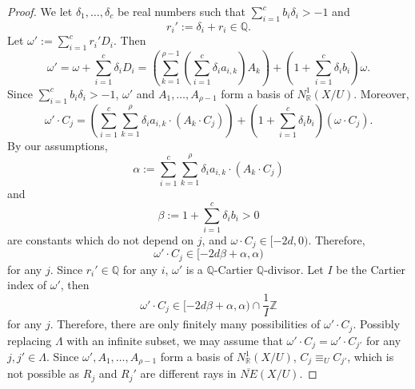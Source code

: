 \documentclass[11pt]{amsart}
\numberwithin{equation}{section}
\newcommand{\Qq}{\mathbb{Q}}
\newcommand{\Rr}{\mathbb{R}}
\theoremstyle{definition}
\theoremstyle{definition}
\theoremstyle{definition}
\begin{document}
\begin{proof}
We let $\delta_1,\dots,\delta_c$ be real numbers such that $\sum_{i=1}^cb_i\delta_i>-1$ and 
$$r_i':=\delta_i+r_i\in\mathbb Q.$$ 
Let $\omega':=\sum_{i=1}^cr_i'D_i$. Then 
$$\omega'=\omega+\sum_{i=1}^c\delta_iD_i=\left(\sum_{k=1}^{\rho-1}\left(\sum_{i=1}^c\delta_ia_{i,k}\right)A_k\right)+\left(1+\sum_{i=1}^c\delta_ib_i\right)\omega.$$
Since $\sum_{i=1}^cb_i\delta_i>-1$, $\omega'$ and $A_1,\dots,A_{\rho-1}$ form a basis of $N^1_\Rr(X/U)$. Moreover,
$$\omega'\cdot C_j=\left(\sum_{i=1}^c\sum_{k=1}^{\rho}\delta_ia_{i,k}\cdot(A_k\cdot C_j)\right)+\left(1+\sum_{i=1}^c\delta_ib_i\right)(\omega\cdot C_j).$$
By our assumptions,
$$\alpha:=\sum_{i=1}^c\sum_{k=1}^{\rho}\delta_ia_{i,k}\cdot(A_k\cdot C_j)$$
and
$$\beta:=1+\sum_{i=1}^c\delta_ib_i>0$$
are constants which do not depend on $j$, and $\omega\cdot C_j\in [-2d,0)$. Therefore,
$$\omega'\cdot C_j\in [-2d\beta+\alpha,\alpha)$$
for any $j$.
Since $r_i'\in\mathbb Q$ for any $i$, $\omega'$ is a $\Qq$-Cartier $\Qq$-divisor. Let $I$ be the Cartier index of $\omega'$, then 
$$\omega'\cdot C_j\in [-2d\beta+\alpha,\alpha)\cap \frac{1}{I}\mathbb Z$$
for any $j$. Therefore, there are only finitely many possibilities of $\omega'\cdot C_j$. Possibly replacing $\Lambda$ with an infinite subset, we may assume that $\omega'\cdot C_j=\omega'\cdot C_{j'}$ for any $j,j'\in\Lambda$. Since $\omega',A_1,\dots,A_{\rho-1}$ form a basis of $N^1_\Rr(X/U)$, $C_j\equiv_U C_{j'}$, which is not possible as $R_j$ and $R_j'$ are different rays in $\overline{NE}(X/U)$.
\end{proof}
\end{document}

